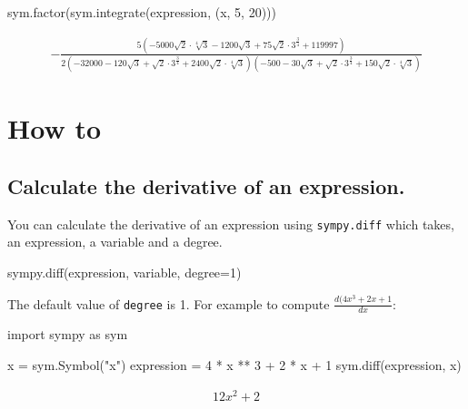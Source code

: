 \begin{pyin}
sym.factor(sym.integrate(expression, (x, 5, 20)))
\end{pyin}




\begin{equation*}
\begin{split}\displaystyle - \frac{5 \left(- 5000 \sqrt{2} \cdot \sqrt[4]{3} - 1200 \sqrt{3} + 75 \sqrt{2} \cdot 3^{\frac{3}{4}} + 119997\right)}{2 \left(-32000 - 120 \sqrt{3} + \sqrt{2} \cdot 3^{\frac{3}{4}} + 2400 \sqrt{2} \cdot \sqrt[4]{3}\right) \left(-500 - 30 \sqrt{3} + \sqrt{2} \cdot 3^{\frac{3}{4}} + 150 \sqrt{2} \cdot \sqrt[4]{3}\right)}\end{split}
\end{equation*}






\section{How to}
\label{\detokenize{tools-for-mathematics/03-calculus/how/main:how}}\label{\detokenize{tools-for-mathematics/03-calculus/how/main::doc}}

\subsection{Calculate the derivative of an expression.}
\label{\detokenize{tools-for-mathematics/03-calculus/how/main:calculate-the-derivative-of-an-expression}}

You can calculate the derivative of an expression using \texttt{sympy.diff} which takes,
an expression, a variable and a degree.


\begin{pyin}
sympy.diff(expression, variable, degree=1)
\end{pyin}



The default value of \texttt{degree} is 1.
For example to compute \(\frac{d (4 x ^ 3 + 2 x + 1}{dx}\):




\begin{pyin}
import sympy as sym

x = sym.Symbol("x")
expression = 4 * x ** 3 + 2 * x + 1
sym.diff(expression, x)
\end{pyin}




\begin{equation*}
\begin{split}\displaystyle 12 x^{2} + 2\end{split}
\end{equation*}




